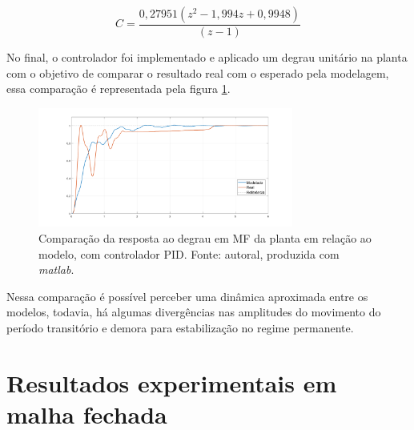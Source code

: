 \documentclass{ifacconf}
\begin{document}
\begin{equation}
  C = \frac{0,27951(z^2 - 1,994z + 0,9948)}{(z-1)}
  \label{eq:controlador}
\end{equation}


No final, o controlador foi implementado e aplicado um degrau unitário na planta com o objetivo de comparar o resultado real com o esperado
pela modelagem, essa comparação é representada pela figura \ref{fig:comparacao_mf_controle_step}.

\begin{figure}[!htb]
  \begin{center}
  \includegraphics[width=8.4cm]{figures/comparacao_mf_controle_step.png}    %
  \caption{Comparação da resposta ao degrau em MF da planta em relação ao modelo, com controlador PID. Fonte: autoral, produzida com \textit{matlab}.} 
  \label{fig:comparacao_mf_controle_step}
  \end{center}
\end{figure}

Nessa comparação é possível perceber uma dinâmica aproximada entre os modelos, todavia, há algumas divergências nas amplitudes do movimento do período transitório
e demora para estabilização no regime permanente.  

\section{Resultados experimentais em malha fechada}
\end{document}
